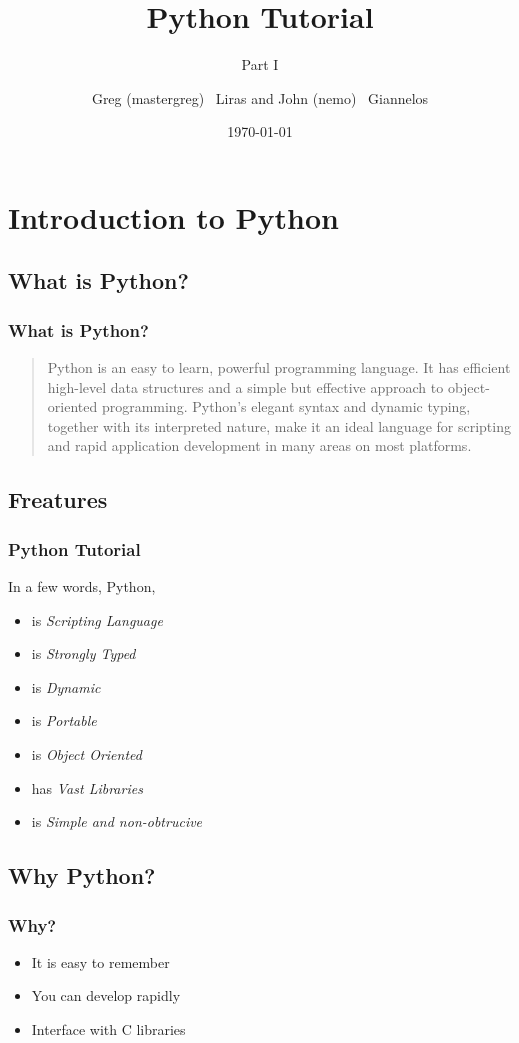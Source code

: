 \documentclass{beamer}
\author[nemo,mastergreg]{Greg (mastergreg) ~Liras and John (nemo)
~Giannelos}
\institute{foss.ntua}
\title{Python Tutorial}
\subtitle{Part I}
\date{\today}
\begin{document}
\begin{frame}
	\titlepage
\end{frame}


\section{Introduction to Python}

\subsection{What is Python?}
\begin{frame}
	\frametitle{What is Python?}
\begin{quote}
Python is an easy to learn, powerful programming language. It has efficient
high-level data structures and a simple but effective approach to
object-oriented programming. Python’s elegant syntax and dynamic typing,
together with its interpreted nature, make it an ideal language for scripting
and rapid application development in many areas on most platforms.
\end{quote}
\end{frame}

\subsection{Freatures}
\begin{frame}
	\frametitle{Python Tutorial}

In a few words, Python,
\begin{itemize}
\item<1-> is \emph{Scripting Language}
\item<2-> is \emph{Strongly Typed}
\item<3-> is \emph{Dynamic}
\item<4-> is \emph{Portable}
\item<5-> is \emph{Object Oriented}
\item<6-> has \emph{Vast Libraries}
\item<7-> is \emph{Simple and non-obtrucive}
\end{itemize}

\end{frame}

\subsection{Why Python?}
\begin{frame}
	\frametitle{Why?}
	\begin{itemize}
	\item<1-> It is easy to remember
	\item<2-> You can develop rapidly
	\item<3-> Interface with C libraries
	\end{itemize}
\end{frame}
\end{document}
